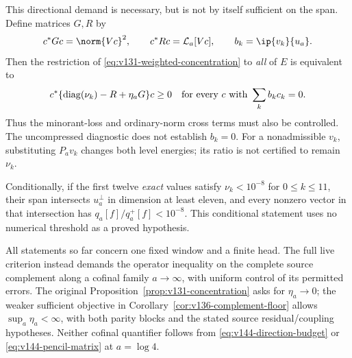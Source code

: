 \begin{proposition}
This directional demand is necessary, but is not by itself sufficient
on the span. Define matrices $G,R$ by
\[
 c^*Gc=\norm{Vc}^2,\qquad c^*Rc=\mathcal L_a[Vc],
 \qquad b_k=\ip{v_k}{u_a}.
\]
Then the restriction of \eqref{eq:v131-weighted-concentration} to
\emph{all} of $E$ is equivalent to
\begin{equation}\label{eq:v144-pencil-matrix}
 c^*\{\operatorname{diag}(\nu_k)-R+\eta_a G\}c\ge0
 \quad\hbox{for every }c\hbox{ with }\sum_k b_kc_k=0.
\end{equation}
Thus the minorant-loss and ordinary-norm cross terms must also be
controlled. The uncompressed diagnostic does not establish $b_k=0$.
For a nonadmissible $v_k$, substituting $P_av_k$ changes both level
energies; its ratio is not certified to remain $\nu_k$.

Conditionally, if the first twelve \emph{exact} values satisfy
$\nu_k<10^{-8}$ for $0\le k\le11$, their span intersects $u_a^\perp$
in dimension at least eleven, and every nonzero vector in that
intersection has $q_a[f]/q_a^+[f]<10^{-8}$. This conditional statement
uses no numerical threshold as a proved hypothesis.

All statements so far concern one fixed window and a finite head.
The full live criterion instead demands the operator inequality on
the complete source complement along a cofinal family $a\to\infty$,
with uniform control of its permitted errors. The original
Proposition~\ref{prop:v131-concentration} asks for $\eta_a\to0$;
the weaker sufficient objective in
Corollary~\ref{cor:v136-complement-floor} allows
$\sup_a\eta_a<\infty$, with both parity blocks and the stated source
residual/coupling hypotheses. Neither cofinal quantifier follows
from \eqref{eq:v144-direction-budget} or
\eqref{eq:v144-pencil-matrix} at $a=\log4$.
\end{proposition}
